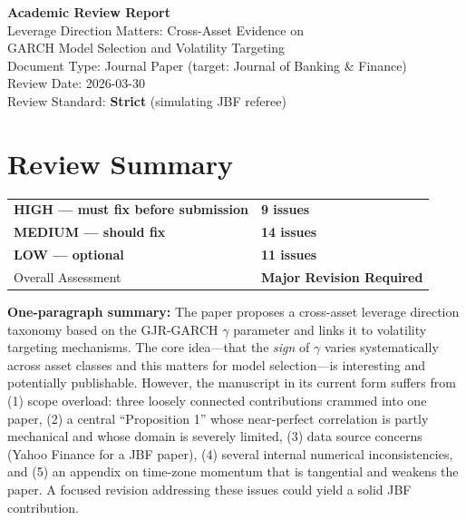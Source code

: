 \documentclass[12pt,a4paper]{article}
\begin{document}
\begin{center}
{\Large\bfseries Academic Review Report}\\[0.5em]
{\large Leverage Direction Matters: Cross-Asset Evidence on\\
GARCH Model Selection and Volatility Targeting}\\[0.5em]
{\normalsize Document Type: Journal Paper (target: Journal of Banking \& Finance)}\\
{\normalsize Review Date: 2026-03-30}\\
{\normalsize Review Standard: \textbf{Strict} (simulating JBF referee)}
\end{center}

\vspace{1em}

\section*{Review Summary}

\begin{tabular}{ll}
\textcolor{errorred}{\textbf{HIGH --- must fix before submission}} & \textbf{9 issues} \\
\textcolor{warncolor}{\textbf{MEDIUM --- should fix}} & \textbf{14 issues} \\
\textcolor{okgreen}{\textbf{LOW --- optional}} & \textbf{11 issues} \\[0.5em]
Overall Assessment & \textbf{Major Revision Required} \\
\end{tabular}

\vspace{0.5em}
\noindent\textbf{One-paragraph summary:}
The paper proposes a cross-asset leverage direction taxonomy based on the GJR-GARCH $\gamma$ parameter and links it to volatility targeting mechanisms. The core idea---that the \emph{sign} of $\gamma$ varies systematically across asset classes and this matters for model selection---is interesting and potentially publishable. However, the manuscript in its current form suffers from (1) scope overload: three loosely connected contributions crammed into one paper, (2) a central ``Proposition 1'' whose near-perfect correlation is partly mechanical and whose domain is severely limited, (3) data source concerns (Yahoo Finance for a JBF paper), (4) several internal numerical inconsistencies, and (5) an appendix on time-zone momentum that is tangential and weakens the paper. A focused revision addressing these issues could yield a solid JBF contribution.
\end{document}
